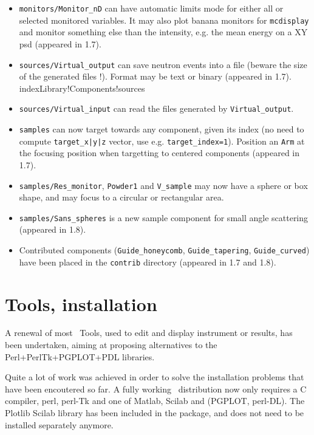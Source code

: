 \begin{itemize}
\item \verb+monitors/Monitor_nD+ can have automatic limits mode for either all or 
    selected monitored variables. It may also plot banana monitors for
    \verb+mcdisplay+ and monitor something else than the intensity, e.g. the mean
    energy on a XY psd (appeared in 1.7). 
\item \verb+sources/Virtual_output+ can save neutron events into a file
    (beware the size of the generated files !). Format may be text or binary
    (appeared in 1.7). index{Library!Components!sources}
\item \verb+sources/Virtual_input+ can read the files generated by \verb+Virtual_output+.
\item \verb+samples+ can now target towards any component, given its index 
    (no need to compute \verb+target_x|y|z+ vector, use e.g. \verb+target_index=1+). 
    Position an \verb+Arm+ at the focusing position when targetting to 
    centered components (appeared in 1.7).
\item \verb+samples/Res_monitor+, \verb+Powder1+ and \verb+V_sample+ may now have a
    sphere or box shape, and may focus to a circular or rectangular area.
\item \verb+samples/Sans_spheres+ is a new sample component for small angle scattering
    (appeared in 1.8). 
\item Contributed components (\verb+Guide_honeycomb+, \verb+Guide_tapering+, \verb+Guide_curved+) have been
    placed in the \verb+contrib+ directory (appeared in 1.7 and 1.8). 
\end{itemize}

\section{Tools, installation}
\label{s:new-features:tools}
  A renewal of most \MCS\ Tools, used to edit and display instrument or
  results,  has been undertaken, aiming at proposing alternatives to the
  Perl+PerlTk+PGPLOT+PDL  libraries.
  
  Quite a lot of work was achieved in order to solve the installation problems
   that have been encoutered so far. A fully working \MCS\ distribution now
   only requires a C compiler, perl, perl-Tk and one of Matlab, Scilab and
   (PGPLOT, perl-DL). The Plotlib Scilab library has  been included in the
   package, and does not need to be installed separately anymore.
  

